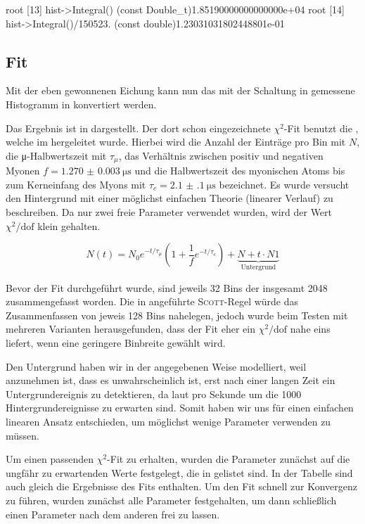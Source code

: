 root [13] hist->Integral()                                                                                   
(const Double_t)1.85190000000000000e+04
root [14] hist->Integral()/150523.
(const double)1.23031031802448801e-01



\subsection{Fit}

Mit der eben gewonnenen Eichung kann nun das mit der Schaltung in
 gemessene Histogramm in  konvertiert werden.

Das Ergebnis ist in  dargestellt. Der dort schon eingezeichnete
$\chi^2$-Fit benutzt die , welche im \cite[Gl. 12]{script} hergeleitet wurde.
Hierbei wird die Anzahl der Einträge pro Bin mit $N$, die μ-Halbwertszeit mit
$τ_μ$, das Verhältnis zwischen positiv und negativen Myonen
$f = \SI{1.270(3)}{\micro\second}$ und die Halbwertszeit des myonischen Atoms
bis zum Kerneinfang des Myons mit $τ_c = \SI{2.1(1)}{\micro\second}$ bezeichnet.
Es wurde versucht den Hintergrund mit einer möglichst einfachen Theorie
(linearer Verlauf) zu beschreiben. Da nur zwei freie Parameter verwendet wurden,
wird der Wert $\chi^2/\mbox{dof}$ klein gehalten.

\begin{equation}
  N(t) = N_0 e^{-t/τ_μ}\left(1+\frac{1}{f}e^{-t/τ_c}\right) + \underbrace{N+t\cdot N1}_{\mbox{Untergrund}}
  \label{eqn:fit}
\end{equation}

Bevor der Fit durchgeführt wurde, sind jeweils 32 Bins der insgesamt 2048
zusammengefasst worden. Die in \cite[Gl. 17]{script} angeführte \textsc{Scott}-Regel
würde das Zusammenfassen von jeweis 128 Bins nahelegen, jedoch wurde beim Testen
mit mehreren Varianten herausgefunden, dass der Fit eher ein  $\chi^2/\mbox{dof}$
nahe eins liefert, wenn eine geringere Binbreite gewählt wird.

Den Untergrund haben wir in der angegebenen Weise modelliert, weil anzunehmen
ist, dass es unwahrscheinlich ist, erst nach einer langen Zeit ein
Untergrundereignis zu detektieren, da laut  pro
Sekunde um die 1000 Hintergrundereignisse zu erwarten sind. Somit haben wir uns
für einen einfachen linearen Ansatz entschieden, um möglichst wenige Parameter
verwenden zu müssen.

Um einen passenden $χ^2$-Fit zu erhalten, wurden die Parameter zunächst auf
die ungfähr zu erwartenden Werte festgelegt, die in  gelistet
sind. In der Tabelle sind auch gleich die Ergebnisse des Fits enthalten.
Um den Fit schnell zur Konvergenz zu führen, wurden zunächst alle Parameter
festgehalten, um dann schließlich einen Parameter nach dem anderen frei zu lassen.


